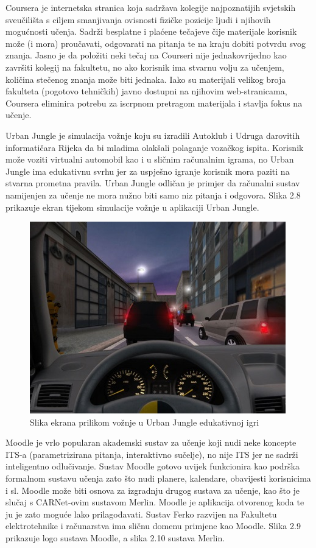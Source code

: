 \documentclass[times, utf8, zavrsni, numeric]{fer}
\begin{document}
\par
Coursera je internetska stranica koja sadržava kolegije najpoznatijih svjetskih sveučilišta s ciljem smanjivanja ovisnosti fizičke pozicije ljudi i njihovih mogućnosti učenja. Sadrži besplatne i plaćene tečajeve čije materijale korisnik može (i mora) proučavati, odgovarati na pitanja te na kraju dobiti potvrdu svog znanja.\citep{coursera} Jasno je da položiti neki tečaj na Courseri nije jednakovrijedno kao završiti kolegij na fakultetu, no ako korisnik ima stvarnu volju za učenjem, količina stečenog znanja može biti jednaka. Iako su materijali velikog broja fakulteta (pogotovo tehničkih) javno dostupni na njihovim web-stranicama, Coursera eliminira potrebu za iscrpnom pretragom materijala i stavlja fokus na učenje.
\par
Urban Jungle je simulacija vožnje koju su izradili Autoklub i Udruga darovitih informatičara Rijeka da bi mladima olakšali polaganje vozačkog ispita.\citep{urbanjungle} Korisnik može voziti virtualni automobil kao i u sličnim računalnim igrama, no Urban Jungle ima edukativnu svrhu jer za uspješno igranje korisnik mora paziti na stvarna prometna pravila. Urban Jungle odličan je primjer da računalni sustav namijenjen za učenje ne mora nužno biti samo niz pitanja i odgovora. Slika 2.8 prikazuje ekran tijekom simulacije vožnje u aplikaciji Urban Jungle. 

\begin{figure}[htb]
	\centering
	\includegraphics[]{img/urbjng.jpg}
	\caption{Slika ekrana prilikom vožnje u Urban Jungle edukativnoj igri\citep{urbanjungpic}}
	\label{fig:urbjng}
\end{figure}

\par
Moodle je vrlo popularan akademski sustav za učenje koji nudi neke koncepte ITS-a (parametrizirana pitanja, interaktivno sučelje), no nije ITS jer ne sadrži inteligentno odlučivanje.\citep{moodle} Sustav Moodle gotovo uvijek funkcionira kao podrška formalnom sustavu učenja zato što nudi planere, kalendare, obavijesti korisnicima i sl. Moodle može biti osnova za izgradnju drugog sustava za učenje, kao što je slučaj s CARNet-ovim sustavom Merlin. Moodle je aplikacija otvorenog koda te ju je zato moguće lako prilagođavati. Sustav Ferko razvijen na Fakultetu elektrotehnike i računarstva ima sličnu domenu primjene kao Moodle. Slika 2.9 prikazuje logo sustava Moodle, a slika 2.10 sustava Merlin.
\end{document}
